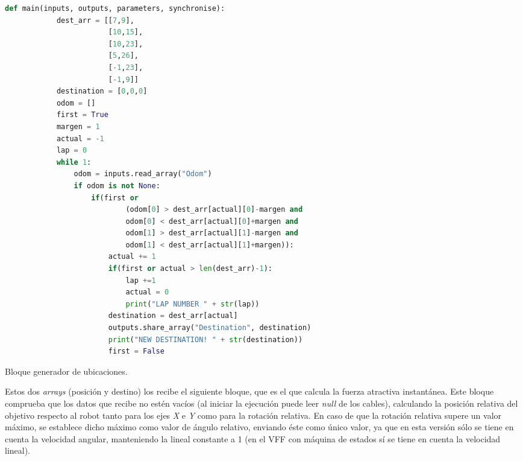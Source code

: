 \begin{code}[H]
    \begin{lstlisting}[language=python]
        def main(inputs, outputs, parameters, synchronise):
            dest_arr = [[7,9],
                        [10,15],
                        [10,23],
                        [5,26],
                        [-1,23],
                        [-1,9]]
            destination = [0,0,0]
            odom = []
            first = True
            margen = 1
            actual = -1
            lap = 0
            while 1:
                odom = inputs.read_array("Odom")
                if odom is not None:
                    if(first or 
                            (odom[0] > dest_arr[actual][0]-margen and 
                            odom[0] < dest_arr[actual][0]+margen and
                            odom[1] > dest_arr[actual][1]-margen and 
                            odom[1] < dest_arr[actual][1]+margen)):
                        actual += 1
                        if(first or actual > len(dest_arr)-1):
                            lap +=1
                            actual = 0    
                            print("LAP NUMBER " + str(lap)) 
                        destination = dest_arr[actual]
                        outputs.share_array("Destination", destination)
                        print("NEW DESTINATION! " + str(destination))
                        first = False
    \end{lstlisting}
    \caption[Bloque generador de ubicaciones]{Bloque generador de ubicaciones.}
    \label{cod:dest_gen}
\end{code}

Estos dos \textit{arrays} (posición y destino) los recibe el siguiente bloque, que es el que calcula la fuerza atractiva instantánea. Este bloque comprueba que
los datos que recibe no estén vacíos (al iniciar la ejecución puede leer \textit{null} de los cables), calculando la posición relativa del objetivo
respecto al robot tanto para los ejes \textit{X} e \textit{Y} como para la rotación relativa. En caso de que la rotación relativa supere un valor máximo,
se establece dicho máximo como valor de ángulo relativo, enviando éste como único valor, ya que en esta versión sólo se tiene en cuenta la velocidad angular,
manteniendo la lineal constante a 1 (en el VFF con máquina de estados sí se tiene en cuenta la velocidad lineal).

